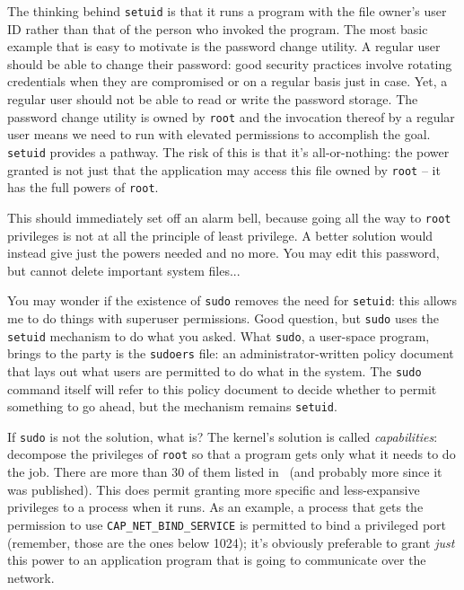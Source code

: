 The thinking behind \texttt{setuid} is that it runs a program with the file owner's user ID rather than that of the person who invoked the program. The most basic example that is easy to motivate is the password change utility. A regular user should be able to change their password: good security practices involve rotating credentials when they are compromised or on a regular basis just in case. Yet, a regular user should not be able to read or write the password storage. The password change utility is owned by \texttt{root} and the invocation thereof by a regular user means we need to run with elevated permissions to accomplish the goal. \texttt{setuid} provides a pathway. The risk of this is that it's all-or-nothing: the power granted is not just that the application may access this file owned by \texttt{root} -- it has the full powers of \texttt{root}.

This should immediately set off an alarm bell, because going all the way to \texttt{root} privileges is not at all the principle of least privilege. A better solution would instead give just the powers needed and no more. You may edit this password, but cannot delete important system files...

You may wonder if the existence of \texttt{sudo} removes the need for \texttt{setuid}: this allows me to do things with superuser permissions. Good question, but \texttt{sudo} uses the \texttt{setuid} mechanism to do what you asked. What \texttt{sudo}, a user-space program, brings to the party is the \texttt{sudoers} file: an administrator-written policy document that lays out what users are permitted to do what in the system. The \texttt{sudo} command itself will refer to this policy document to decide whether to permit something to go ahead, but the mechanism remains \texttt{setuid}.

If \texttt{sudo} is not the solution, what is? The kernel's solution is called \textit{capabilities}: decompose the privileges of \texttt{root} so that a program gets only what it needs to do the job. There are more than 30 of them listed in~\cite{lpi} (and probably more since it was published). This does permit granting more specific and less-expansive privileges to a process when it runs. As an example, a process that gets the permission to use \texttt{CAP\_NET\_BIND\_SERVICE} is permitted to bind a privileged port (remember, those are the ones below 1024); it's obviously preferable to grant \textit{just} this power to an application program that is going to communicate over the network.


